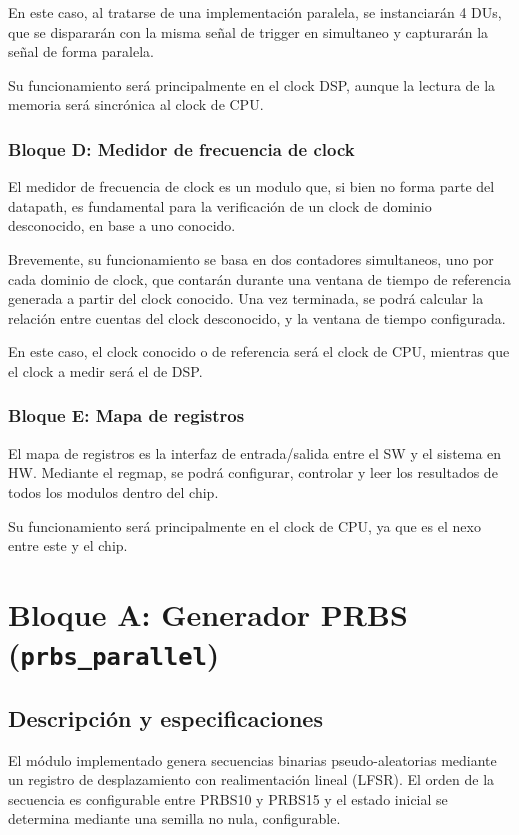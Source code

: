 \documentclass[10pt,a4paper]{article}
\begin{document}
En este caso, al tratarse de una implementación paralela, se instanciarán 4 DUs, que 
se dispararán con la misma señal de trigger en simultaneo y capturarán la señal de 
forma paralela.

Su funcionamiento será principalmente en el clock DSP, aunque la lectura de la memoria
será sincrónica al clock de CPU.

\subsubsection*{Bloque D: Medidor de frecuencia de clock}
El medidor de frecuencia de clock es un modulo que, si bien no forma parte del 
datapath, es fundamental para la verificación de un clock de dominio desconocido, en 
base a uno conocido.

Brevemente, su funcionamiento se basa en dos contadores simultaneos, uno por cada 
dominio de clock, que contarán durante una ventana de tiempo de referencia generada a 
partir del clock conocido. Una vez terminada, se podrá calcular la relación entre 
cuentas del clock desconocido, y la ventana de tiempo configurada.

En este caso, el clock conocido o de referencia será el clock de CPU, mientras que el
clock a medir será el de DSP.

\subsubsection*{Bloque E: Mapa de registros}
El mapa de registros es la interfaz de entrada/salida entre el SW y el sistema en HW. 
Mediante el regmap, se podrá configurar, controlar y leer los resultados de todos
los modulos dentro del chip.

Su funcionamiento será principalmente en el clock de CPU, ya que es el nexo entre este
y el chip.

\section{Bloque A: Generador PRBS (\texttt{prbs\_parallel})}
\label{sec:prbs}

\subsection{Descripción y especificaciones}
El módulo implementado genera secuencias binarias pseudo-aleatorias mediante un
registro de desplazamiento con realimentación lineal (LFSR). El orden de la secuencia
es configurable entre PRBS10 y PRBS15 y el estado inicial se determina mediante una
semilla no nula, configurable.
\end{document}

